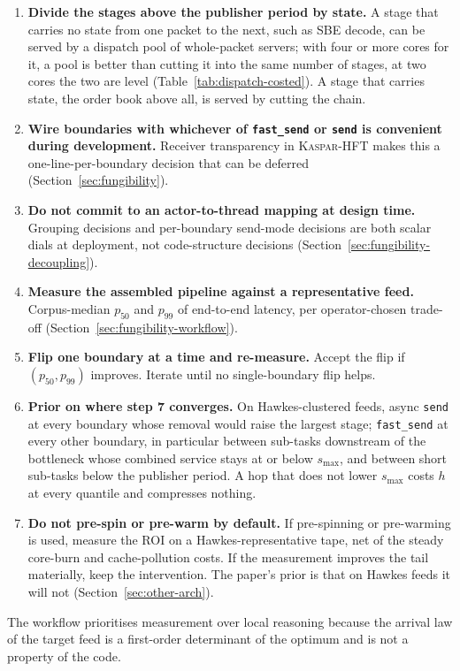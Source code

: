\documentclass[11pt]{article}
\newcommand{\kasparhft}{\textsc{Kaspar-HFT}}
\begin{document}
\begin{enumerate}
service time only through the largest stage (Table~\ref{tab:delta}).
    \item \textbf{Divide the stages above the publisher period by state.} A stage that carries no
state from one packet to the next, such as SBE decode, can be served by a dispatch pool of
whole-packet servers; with four or more cores for it, a pool is better than cutting it
into the same number of stages, at two cores the two are level
(Table~\ref{tab:dispatch-costed}). A stage that carries state, the order book above all,
is served by cutting the chain.
    \item \textbf{Wire boundaries with whichever of \texttt{fast\_send} or \texttt{send}
is convenient during development.} Receiver transparency in \kasparhft{} makes this a
one-line-per-boundary decision that can be deferred (Section~\ref{sec:fungibility}).
    \item \textbf{Do not commit to an actor-to-thread mapping at design time.} Grouping
decisions and per-boundary send-mode decisions are both scalar dials at deployment, not
code-structure decisions (Section~\ref{sec:fungibility-decoupling}).
    \item \textbf{Measure the assembled pipeline against a representative feed.}
Corpus-median $p_{50}$ and $p_{99}$ of end-to-end latency, per operator-chosen trade-off
(Section~\ref{sec:fungibility-workflow}).
    \item \textbf{Flip one boundary at a time and re-measure.} Accept the flip if
$(p_{50}, p_{99})$ improves. Iterate until no single-boundary flip helps.
    \item \textbf{Prior on where step 7 converges.} On Hawkes-clustered feeds, async
\texttt{send} at every boundary whose removal would raise the largest stage;
\texttt{fast\_send} at every other boundary, in particular between sub-tasks downstream of
the bottleneck whose combined service stays at or below $s_{\max}$, and between short
sub-tasks below the publisher period. A hop that does not lower $s_{\max}$ costs $h$ at every
quantile and compresses nothing.
    \item \textbf{Do not pre-spin or pre-warm by default.} If pre-spinning or pre-warming
is used, measure the ROI on a Hawkes-representative tape, net of the steady core-burn and
cache-pollution costs. If the measurement improves the tail materially, keep the
intervention. The paper's prior is that on Hawkes feeds it will not
(Section~\ref{sec:other-arch}).
\end{enumerate}
The workflow prioritises measurement over local reasoning because the arrival law of
the target feed is a first-order determinant of the optimum and is not a property of the
code.
\end{document}
